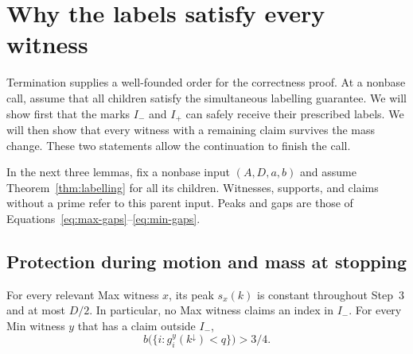 \section{Why the labels satisfy every witness}
\label{sec:correctness}

Termination supplies a well-founded order for the correctness proof.
At a nonbase call, assume that all children satisfy the simultaneous
labelling guarantee. We will show first that the marks $I_-$ and
$I_+$ can safely receive their prescribed labels. We will then show
that every witness with a remaining claim survives the mass change.
These two statements allow the continuation to finish the call.

In the next three lemmas, fix a nonbase input $(A,D,a,b)$ and assume
Theorem~\ref{thm:labelling} for all its children. Witnesses, supports,
and claims without a prime refer to this parent input. Peaks and gaps
are those of Equations~\eqref{eq:max-gaps}--\eqref{eq:min-gaps}.

\subsection{Protection during motion and mass at stopping}

\begin{lemma}
\label{lem:down}
For every relevant Max witness $x$, its peak $s_x(k)$ is constant
throughout Step~3 and at most $D/2$. In particular, no Max witness
claims an index in $I_-$. For every Min witness $y$ that has a claim
outside $I_-$,
\begin{equation}
             b\bigl(\{i:g_i^y(k^{\downarrow})<q\}\bigr)>3/4.
 \label{eq:down-heavy}
\end{equation}
\end{lemma}

